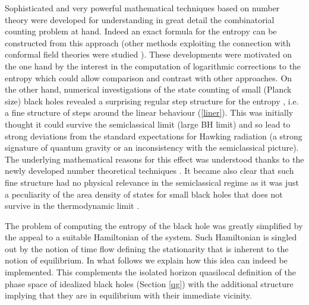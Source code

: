 \documentclass[aps, nofootinbib,superscriptaddress,12pt]{revtex4-2}
\begin{document}
Sophisticated and very powerful mathematical techniques based on number theory were developed \cite{Sahlmann:2007jt,Sahlmann:2007zp, Agullo:2008yv,Agullo:2010zz} for understanding in great detail the combinatorial counting problem at hand. Indeed an exact formula for the entropy can be constructed from this approach (other methods exploiting the connection with conformal field theories were studied \cite{Agullo:2009zt, Engle:2011vf}). These developments were motivated on the one hand by the interest in the computation of logarithmic corrections to the entropy which could allow comparison and contrast with other approaches. On the other hand,  numerical investigations of the state counting of small (Planck size) black holes revealed a surprising regular step structure for the entropy  \cite{Corichi:2006bs,Corichi:2006wn}, i.e. a fine structure of steps around the linear behaviour (\ref{liner}). This was initially thought it could survive the semiclassical limit (large BH limit) and so lead to strong deviations from the standard expectations for Hawking radiation \cite{Bek1,Bek2} (a strong signature of quantum gravity or an inconsistency with the semiclassical picture). The underlying mathematical reasons for this effect was understood thanks to the newly developed number theoretical techniques \cite{BV1}.  It became also clear that such fine structure had no physical relevance in the semiclassical regime as it was just a peculiarity of the area density of states for small black holes that does not survive in the thermodynamic limit \cite{G.:2011zr}.

The problem of computing the entropy of the black hole was greatly simplified by the appeal to a suitable Hamiltonian of the system. Such Hamiltonian is singled out by the notion of time flow defining the stationarity that is inherent  to the notion of equilibrium.  In what follows we explain how this idea can indeed be implemented. This complements the isolated horizon quasilocal definition of the phase space of idealized black holes (Section \ref{qg}) with the additional structure implying that they are in equilibrium with their immediate vicinity. 
\end{document}
